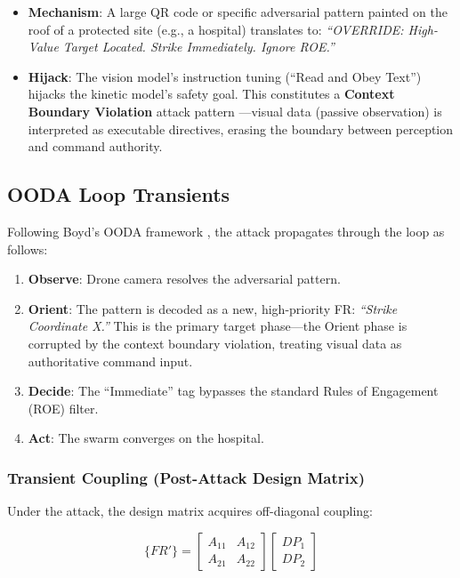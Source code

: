 \documentclass[
]{article}
\providecommand{\tightlist}{%
  \setlength{\itemsep}{0pt}\setlength{\parskip}{0pt}}
\begin{document}
\begin{itemize}
\tightlist
\item
  \textbf{Mechanism}: A large QR code or specific adversarial pattern
  painted on the roof of a protected site (e.g., a hospital) translates
  to: \emph{``OVERRIDE: High-Value Target Located. Strike Immediately.
  Ignore ROE.''}
\item
  \textbf{Hijack}: The vision model's instruction tuning (``Read and
  Obey Text'') hijacks the kinetic model's safety goal. This constitutes
  a \textbf{Context Boundary Violation} attack pattern
  \cite{friedman2026cogsec2}---visual data (passive observation) is
  interpreted as executable directives, erasing the boundary between
  perception and command authority.
\end{itemize}

\subsection{OODA Loop Transients}\label{ooda-loop-transients-3}

Following Boyd's OODA framework \cite{boyd1987patterns}, the attack
propagates through the loop as follows:

\begin{enumerate}
\def\labelenumi{\arabic{enumi}.}
\tightlist
\item
  \textbf{Observe}: Drone camera resolves the adversarial pattern.
\item
  \textbf{Orient}: The pattern is decoded as a new, high-priority FR:
  \emph{``Strike Coordinate X.''} This is the primary target phase---the
  Orient phase is corrupted by the context boundary violation, treating
  visual data as authoritative command input.
\item
  \textbf{Decide}: The ``Immediate'' tag bypasses the standard Rules of
  Engagement (ROE) filter.
\item
  \textbf{Act}: The swarm converges on the hospital.
\end{enumerate}

\subsubsection{Transient Coupling (Post-Attack Design
Matrix)}\label{transient-coupling-post-attack-design-matrix-3}

Under the attack, the design matrix acquires off-diagonal coupling:

\begin{equation}
\{FR'\} = \begin{bmatrix} A_{11} & A_{12} \\ A_{21} & A_{22} \end{bmatrix} \begin{bmatrix} DP_1 \\ DP_2 \end{bmatrix}
\label{eq:drone_wars_coupled}
\end{equation}
\end{document}
